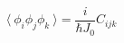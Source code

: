 \begin{equation}
\langle~\phi_i \phi_j \phi_k ~\rangle = \frac{i}{\hbar J_0} C_{ijk}
\end{equation} 
